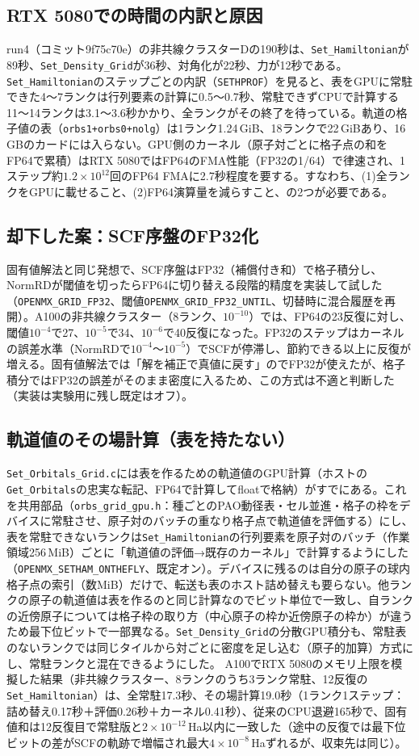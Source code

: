 \documentclass[a4paper,11pt]{ltjsarticle}
\newcommand{\code}[1]{\texttt{#1}}
\newcommand{\E}[1]{\times10^{#1}}
\begin{document}
\subsection{RTX 5080での時間の内訳と原因}
run4（コミット9f75c70e）の非共線クラスターDの190秒は、\code{Set\_Hamiltonian}が89秒、\code{Set\_Density\_Grid}が36秒、対角化が22秒、力が12秒である。\code{Set\_Hamiltonian}のステップごとの内訳（\code{SETHPROF}）を見ると、表をGPUに常駐できた4〜7ランクは行列要素の計算に0.5〜0.7秒、常駐できずCPUで計算する11〜14ランクは3.1〜3.6秒かかり、全ランクがその終了を待っている。軌道の格子値の表（\code{orbs1+orbs0+nolg}）は1ランク1.24\,GiB、18ランクで22\,GiBあり、16\,GBのカードには入らない。GPU側のカーネル（原子対ごとに格子点の和をFP64で累積）はRTX 5080ではFP64のFMA性能（FP32の1/64）で律速され、1ステップ約$1.2\E{12}$回のFP64 FMAに2.7秒程度を要する。すなわち、(1)全ランクをGPUに載せること、(2)FP64演算量を減らすこと、の2つが必要である。
\subsection{却下した案：SCF序盤のFP32化}
固有値解法と同じ発想で、SCF序盤はFP32（補償付き和）で格子積分し、NormRDが閾値を切ったらFP64に切り替える段階的精度を実装して試した（\code{OPENMX\_GRID\_FP32}、閾値\code{OPENMX\_GRID\_FP32\_UNTIL}、切替時に混合履歴を再開）。A100の非共線クラスター（8ランク、$10^{-10}$）では、FP64の23反復に対し、閾値$10^{-4}$で27、$10^{-5}$で34、$10^{-6}$で40反復になった。FP32のステップはカーネルの誤差水準（NormRDで$10^{-4}$〜$10^{-5}$）でSCFが停滞し、節約できる以上に反復が増える。固有値解法では「解を補正で真値に戻す」のでFP32が使えたが、格子積分ではFP32の誤差がそのまま密度に入るため、この方式は不適と判断した（実装は実験用に残し既定はオフ）。
\subsection{軌道値のその場計算（表を持たない）}
\code{Set\_Orbitals\_Grid.c}には表を作るための軌道値のGPU計算（ホストの\code{Get\_Orbitals}の忠実な転記、FP64で計算してfloatで格納）がすでにある。これを共用部品（\code{orbs\_grid\_gpu.h}：種ごとのPAO動径表・セル並進・格子の枠をデバイスに常駐させ、原子対のバッチの重なり格子点で軌道値を評価する）にし、表を常駐できないランクは\code{Set\_Hamiltonian}の行列要素を原子対のバッチ（作業領域256\,MiB）ごとに「軌道値の評価→既存のカーネル」で計算するようにした（\code{OPENMX\_SETHAM\_ONTHEFLY}、既定オン）。デバイスに残るのは自分の原子の球内格子点の索引（数MiB）だけで、転送も表のホスト詰め替えも要らない。他ランクの原子の軌道値は表を作るのと同じ計算なのでビット単位で一致し、自ランクの近傍原子については格子枠の取り方（中心原子の枠か近傍原子の枠か）が違うため最下位ビットで一部異なる。\code{Set\_Density\_Grid}の分散GPU積分も、常駐表のないランクでは同じタイルから対ごとに密度を足し込む（原子的加算）方式にし、常駐ランクと混在できるようにした。
A100でRTX 5080のメモリ上限を模擬した結果（非共線クラスター、8ランクのうち3ランク常駐、12反復の\code{Set\_Hamiltonian}）は、全常駐17.3秒、その場計算19.0秒（1ランク1ステップ：詰め替え0.17秒＋評価0.26秒＋カーネル0.41秒）、従来のCPU退避165秒で、固有値和は12反復目で常駐版と$2\E{-12}$\,Ha以内に一致した（途中の反復では最下位ビットの差がSCFの軌跡で増幅され最大$4\E{-8}$\,Haずれるが、収束先は同じ）。
\end{document}
